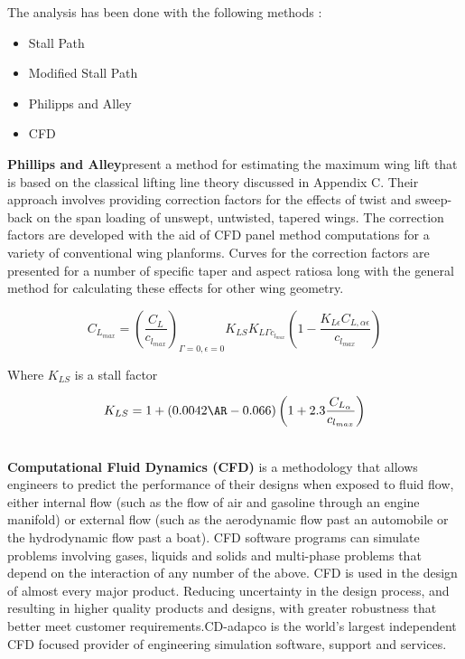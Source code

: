 The analysis has been done with the following methods :

\begin{itemize}
\item Stall Path
\item Modified Stall Path
\item Philipps and Alley
\item CFD
\end{itemize}

{\bfseries Phillips and Alley}present a method for estimating the maximum wing lift that is based on the classical lifting line theory discussed in Appendix C. Their approach involves providing correction factors for the effects of twist and sweep-back on the span loading of unswept, untwisted, tapered wings. The correction factors are developed with the aid of CFD panel method computations for a variety of conventional wing planforms. Curves for the correction factors are presented for a number of specific taper and aspect ratiosa long with the general method for calculating these effects for other wing geometry. \cite{sforza2014commercial}

\begin{equation}
C_{L_{max}} = \left ( \frac{C_L}{c_{l_{max}}}\right)_{\Gamma =0 , \epsilon =0} K_{LS} K_{L\Gamma c_{l_{max}}} \left ( 1 - \frac { K_{L \epsilon} C_{L,\alpha \epsilon}}{c_{l_{max}}} \right) 
\end{equation}

Where $K_{LS}$ is a stall factor

\begin{equation}
K_{LS}=1 + (0.0042 \AR -0.066) \left (1+2.3 \frac{C_{L_{\alpha}}}{ c_{l_{max}}} \right )
\end{equation}

\noindent \\
{\bfseries Computational Fluid Dynamics (CFD)} is a methodology that allows engineers to predict the performance of their designs when exposed to fluid flow, either internal flow (such as the flow of air and gasoline through an engine manifold) or external flow (such as the aerodynamic flow past an automobile or the hydrodynamic flow past a boat). CFD software programs can simulate problems involving gases, liquids and solids and multi-phase problems that depend on the interaction of any number of the above. CFD is used in the design of almost every major product. Reducing uncertainty in the design process, and resulting in higher quality products and designs, with greater robustness that better meet customer requirements.CD-adapco is the world's largest independent CFD focused provider of engineering simulation software, support and services. \cite{adapco}


